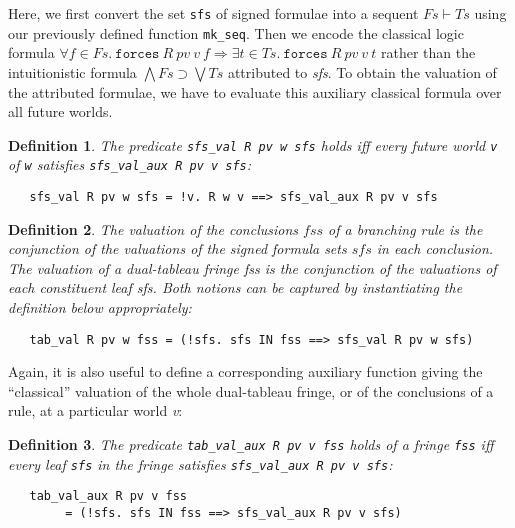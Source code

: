 \documentclass[a4paper]{article}
\newtheorem{definition}{Definition}
\begin{document}
Here, we first convert the set \texttt{sfs} of signed formulae into a
sequent $Fs \vdash Ts$ using our previously defined function
\texttt{mk\_seq}.  Then we encode the classical logic formula
$\forall f \in \mathit{Fs}.\ \mathtt{forces}~ R~ pv~ v~ f \Rightarrow \exists t
\in \mathit{Ts}.\ \mathtt{forces} ~R ~pv ~v ~t$ rather than the intuitionistic
formula $\bigwedge \mathit{Fs} \supset \bigvee \mathit{Ts}$ attributed
to \textit{sfs}. To obtain the valuation of the attributed formulae,
we have to evaluate this auxiliary classical formula over all future
worlds.
\begin{definition}
The predicate
\texttt{sfs\_val R pv w sfs}
holds iff every future world 
\texttt{v} of 
\texttt{w} satisfies
\texttt{sfs\_val\_aux R pv v sfs}:
\begin{verbatim}
   sfs_val R pv w sfs = !v. R w v ==> sfs_val_aux R pv v sfs 
\end{verbatim}
\end{definition}


\begin{definition}
The valuation of the conclusions $\mathit{fss}$ of a branching rule is the
conjunction of the valuations of the signed formula sets $\mathit{sfs}$ in
each conclusion. The valuation of a
dual-tableau fringe \textit{fss} is the conjunction of the valuations
of each constituent leaf \textit{sfs}. Both notions can be
captured by instantiating the definition below appropriately:
\begin{verbatim}
   tab_val R pv w fss = (!sfs. sfs IN fss ==> sfs_val R pv w sfs)
\end{verbatim}
\end{definition}

Again, it is also useful to define a corresponding auxiliary function
giving the ``classical'' valuation of the whole dual-tableau fringe,
or of the conclusions of a rule, at a particular world \textit{v}:
\begin{definition}
The predicate
\texttt{tab\_val\_aux R pv v fss}
holds of a fringe 
\texttt{fss}
iff every leaf
\texttt{sfs}
in the fringe satisfies
\texttt{sfs\_val\_aux R pv v sfs}:
\begin{verbatim}
   tab_val_aux R pv v fss 
        = (!sfs. sfs IN fss ==> sfs_val_aux R pv v sfs)
\end{verbatim}
\end{definition}
\end{document}
